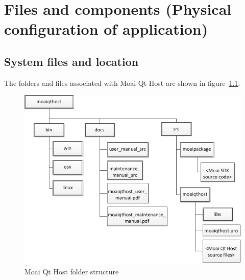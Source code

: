 \chapter{Files and components (Physical configuration of application)}

\section{System files and location}

The folders and files associated with Moai Qt Host are shown in figure~\ref{fig:folders}.

\begin{figure}[htbp]
	\begin{center}
	\includegraphics[scale=0.65]{images/moai_qt_host_folders.png}
	\caption{Moai Qt Host folder structure\label{fig:folders}}
	\end{center}
\end{figure}
